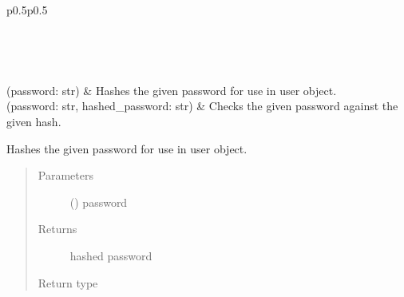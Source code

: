 \documentclass[letterpaper,10pt,english]{sphinxmanual}
\begin{document}
\begin{savenotes}\sphinxatlongtablestart\begin{longtable}[c]{p{0.5\linewidth}p{0.5\linewidth}}
\hline

\endfirsthead

%
{}\\
\hline

\endhead

\hline
{}\\
\endfoot

\endlastfoot

{\hyperref[\detokenize{autoapi/pine/client/password/index:pine.client.password.hash_password}]{}}(password: str)
&
Hashes the given password for use in user object.
\\
\hline
{\hyperref[\detokenize{autoapi/pine/client/password/index:pine.client.password.check_password}]{}}(password: str, hashed\_password: str)
&
Checks the given password against the given hash.
\\
\hline
\end{longtable}\sphinxatlongtableend\end{savenotes}

\begin{fulllineitems}
\label{\detokenize{autoapi/pine/client/password/index:pine.client.password.hash_password}}
Hashes the given password for use in user object.
\begin{quote}\begin{description}
\item[{Parameters}] \leavevmode
{} () \textendash{} password

\item[{Returns}] \leavevmode
hashed password

\item[{Return type}] \leavevmode
{}

\end{description}\end{quote}

\end{fulllineitems}
\end{document}
